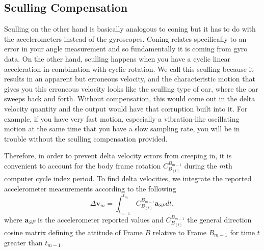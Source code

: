 \documentclass[journal]{IEEEtran}
\begin{document}
%
\subsection{Sculling Compensation}
Sculling on the other hand is basically analogous to coning but it has to do with the accelerometers instead of the gyroscopes. Coning relates specifically to an error in your angle measurement and so fundamentally it is coming from gyro data. On the other hand, sculling happens when you have a cyclic linear acceleration in combination with cyclic rotation. We call this sculling because it results in an apparent but erroneous velocity, and the characteristic motion
that gives you this erroneous velocity looks like the sculling type of oar, where the oar sweeps back and forth. Without compensation, this would come out in the delta velocity quantity and the output would have that corruption built into it. For example, if you have very fast motion, especially a vibration-like oscillating motion at the same time that you have a slow sampling
rate, you will be in trouble without the sculling compensation provided.\par

Therefore, in order to prevent delta velocity errors from creeping in, it is convenient to account for the body frame rotation $C_{B_{
(t)}}^{B_{m-1}}$ during the $m$th computer cycle index period. To find delta velocities, we integrate the reported accelerometer measurements according to the following
\begin{equation}\label{eq_deltaV}
\Delta\boldsymbol{v}_m = \int_{t_{m-1}}^{t_m}C_{B_{(t)}}^{B_{m-1}} \boldsymbol{a}_{SF}dt,
\end{equation}
where $\boldsymbol{a}_{SF}$ is the accelerometer reported values and $C_{B_{(t)}}^{B_{m-1}}$ the general direction cosine matrix defining the attitude of Frame ${B}$ relative to Frame ${B_{m-1}}$ for time $t$ greater than $t_{m-1}$.
\end{document}
